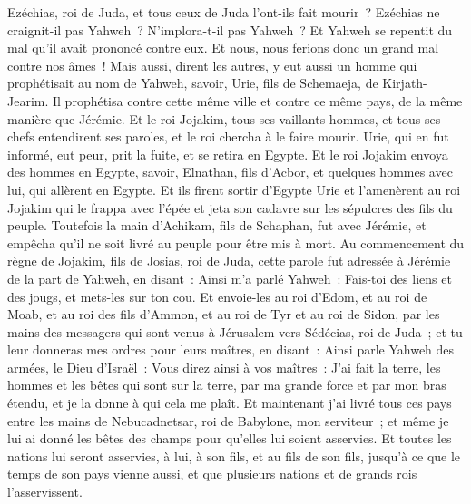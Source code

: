 \begin{multicols}{2}
Ezéchias, roi de Juda, et tous ceux de Juda l'ont-ils fait mourir~? Ezéchias ne craignit-il pas Yahweh~? N'implora-t-il pas Yahweh~? Et Yahweh se repentit du mal qu'il avait prononcé contre eux. Et nous, nous ferions donc un grand mal contre nos âmes~!
Mais aussi, dirent les autres, y eut aussi un homme qui prophétisait au nom de Yahweh, savoir, Urie, fils de Schemaeja, de Kirjath-Jearim. Il prophétisa contre cette même ville et contre ce même pays, de la même manière que Jérémie.
Et le roi Jojakim, tous ses vaillants hommes, et tous ses chefs entendirent ses paroles, et le roi chercha à le faire mourir. Urie, qui en fut informé, eut peur, prit la fuite, et se retira en Egypte.
Et le roi Jojakim envoya des hommes en Egypte, savoir, Elnathan, fils d'Acbor, et quelques hommes avec lui, qui allèrent en Egypte.
Et ils firent sortir d'Egypte Urie et l'amenèrent au roi Jojakim qui le frappa avec l'épée et jeta son cadavre sur les sépulcres des fils du peuple.
Toutefois la main d'Achikam, fils de Schaphan, fut avec Jérémie, et empêcha qu'il ne soit livré au peuple pour être mis à mort.
\VerseOne{}Au commencement du règne de Jojakim, fils de Josias, roi de Juda, cette parole fut adressée à Jérémie de la part de Yahweh, en disant~:
Ainsi m'a parlé Yahweh~: Fais-toi des liens et des jougs, et mets-les sur ton cou.
Et envoie-les au roi d'Edom, et au roi de Moab, et au roi des fils d'Ammon, et au roi de Tyr et au roi de Sidon, par les mains des messagers qui sont venus à Jérusalem vers Sédécias, roi de Juda~;
et tu leur donneras mes ordres pour leurs maîtres, en disant~: Ainsi parle Yahweh des armées, le Dieu d'Israël~: Vous direz ainsi à vos maîtres~:
J'ai fait la terre, les hommes et les bêtes qui sont sur la terre, par ma grande force et par mon bras étendu, et je la donne à qui cela me plaît.
Et maintenant j'ai livré tous ces pays entre les mains de Nebucadnetsar, roi de Babylone, mon serviteur~; et même je lui ai donné les bêtes des champs pour qu'elles lui soient asservies.
Et toutes les nations lui seront asservies, à lui, à son fils, et au fils de son fils, jusqu'à ce que le temps de son pays vienne aussi, et que plusieurs nations et de grands rois l'asservissent.

\end{multicols}
